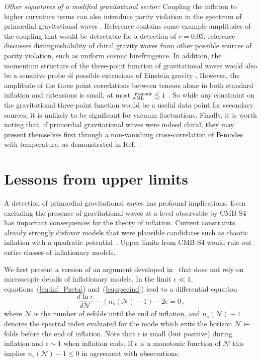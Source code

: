 {\it Other signatures of a modified gravitational sector:} Coupling the inflaton to higher curvature terms can also introduce parity violation in the spectrum of primordial gravitational waves \cite{lue99,Alexander:2004wk,Contaldi:2008yz,Takahashi:2009wc}. Reference \cite{Takahashi:2009wc} contains some example amplitudes of the coupling that would be detectable for a detection of $r=0.05$; reference \cite{2010PhRvD..81l3529G} discusses distinguishability of chiral gravity waves from other possible sources of parity violation, such as uniform cosmic birefringence. In addition, the momentum structure of the three-point function of gravitational waves would also be a sensitive probe of possible extensions of Einstein gravity \cite{Maldacena:2011nz}. However, the amplitude of the three point correlations between tensors alone in both standard inflation and extensions is small, at most $f^{\rm tensor}_{\rm NL}\lesssim 1$ \cite{Maldacena:2002vr,Maldacena:2011nz}. So while any constraint on the gravitational three-point function would be a useful data point for secondary sources, it is unlikely to be significant for vacuum fluctuations. Finally, it is worth noting that, if primordial gravitational waves were indeed chiral, they may present themselves first through a non-vanishing cross-correlation of B-modes with temperature, as demonstrated in Ref.~\cite{Contaldi:2008yz}.


\section{Lessons from upper limits} 
\label{sec:upperLimits}
A detection of primordial gravitational waves has profound implications. Even excluding the presence of gravitational waves at a level observable by CMB-S4 has important consequences for the theory of inflation. Current constraints already strongly disfavor models that were plausible candidates such as chaotic inflation with a quadratic potential~\cite{bicepkeckplanck15}. Upper limits from CMB-S4 would rule out entire classes of inflationary models. 

We first present a version of an argument developed in~\cite{Mukhanov:2013tua,Roest:2013fha,Creminelli:2014nqa} that does not rely on microscopic details of inflationary models. In the limit $\epsilon\ll1$, equations~(\ref{eq:inf_Pzeta}) and~(\ref{eq:specind}) lead to a differential equation
\begin{equation}\label{eq:epsdiffeq}
\frac{d\ln\epsilon}{d\mathcal{N}}-(n_s(\mathcal{N})-1)-2\epsilon=0\,,
\end{equation} 
where $\mathcal{N}$ is the number of e-folds until the end of inflation, and $n_s(\mathcal{N})-1$ denotes the spectral index evaluated for the mode which exits the horizon $\mathcal{N}$ e-folds before the end of inflation. Note that $\epsilon$ is small (but positive) during inflation and $\epsilon\sim 1$ when inflation ends. If $\epsilon$ is a monotonic function of $\mathcal{N}$ this implies $n_s(\mathcal{N})-1\leq 0$ in agreement with observations. 

